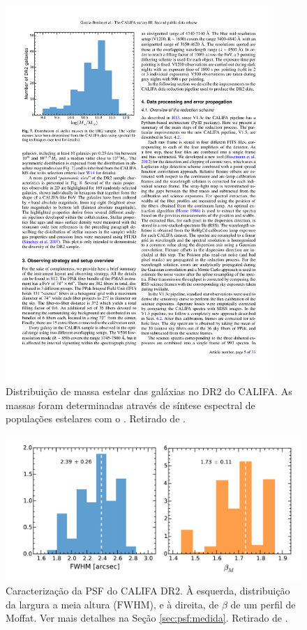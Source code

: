 \begin{figure}
	\includegraphics[width=0.9\textwidth]{figuras/CALIFAMass}
	\caption[Distribuição de massa das galáxias no  DR2 do CALIFA]
	{Distribuição de massa estelar das galáxias no DR2 do CALIFA. As massas
	foram determinadas através de síntese espectral de populações estelares com o
	\starlight. Retirado de \citet{GarciaBenito2015}.}
	\label{fig:DRMass}
\end{figure}

\begin{figure}
	\includegraphics[width=1.0\textwidth]{figuras/DR2PSF}
	\caption[Caracterização da PSF do CALIFA DR2]
	{Caracterização da PSF do CALIFA DR2. À esquerda, distribuição da largura a
	meia altura ($\mathrm{FWHM}$), e à direita, de $\beta$ de um perfil de Moffat.
	Ver mais detalhes na Seção \ref{sec:psf:medida}. Retirado de
	\citet{GarciaBenito2015}.}
	\label{fig:DR2PSF}
\end{figure}

